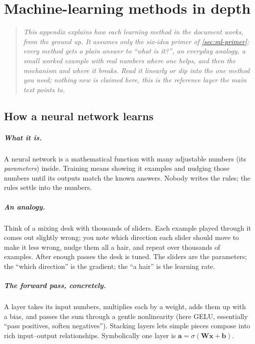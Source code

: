 \chapter{Machine-learning methods in depth}
\label{ch:ml-appendix}

\begin{quote}\itshape
This appendix explains \emph{how} each learning method in the document works, from the ground
up. It assumes only the six-idea primer of \cref{sec:ml-primer}; every method gets a plain
answer to ``what is it?'', an everyday analogy, a small worked example with real numbers
where one helps, and then the mechanism and where it breaks. Read it linearly or dip into the
one method you need; nothing new is claimed here, this is the reference layer the main text
points to.
\end{quote}

\section{How a neural network learns}
\label{sec:ml-nn}

\paragraph{What it is.} A neural network is a mathematical function with many adjustable
numbers (its \emph{parameters}) inside. Training means showing it examples and nudging those
numbers until its outputs match the known answers. Nobody writes the rules; the rules settle
into the numbers.

\paragraph{An analogy.} Think of a mixing desk with thousands of sliders. Each example played
through it comes out slightly wrong; you note which direction each slider should move to make
it less wrong, nudge them all a hair, and repeat over thousands of examples. After enough
passes the desk is tuned. The sliders are the parameters; the ``which direction'' is the
gradient; the ``a hair'' is the learning rate.

\paragraph{The forward pass, concretely.} A layer takes its input numbers, multiplies each by
a weight, adds them up with a bias, and passes the sum through a gentle nonlinearity (here
GELU, essentially ``pass positives, soften negatives''). Stacking layers lets simple pieces
compose into rich input--output relationships. Symbolically one layer is
$\mathbf{a} = \sigma(\mathbf{W}\mathbf{x}+\mathbf{b})$.

